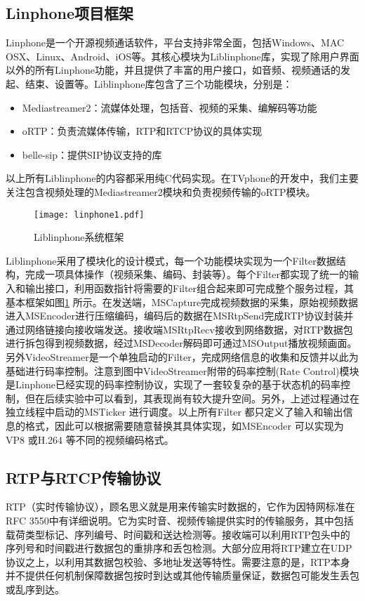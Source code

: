     \subsection{Linphone项目框架}
    Linphone是一个开源视频通话软件，平台支持非常全面，包括Windows、MAC OSX、Linux、Android、iOS等。其核心模块为Liblinphone库，实现了除用户界面以外的所有Linphone功能，并且提供了丰富的用户接口，如音频、视频通话的发起、结束、设置等。Liblinphone库包含了三个功能模块，分别是：
    \begin{itemize}
        \item Mediastreamer2：流媒体处理，包括音、视频的采集、编解码等功能
        \item oRTP：负责流媒体传输，RTP和RTCP协议的具体实现
        \item belle-sip：提供SIP协议支持的库
    \end{itemize}
    以上所有Liblinphone的内容都采用纯C代码实现。在TVphone的开发中，我们主要关注包含视频处理的Mediastreamer2模块和负责视频传输的oRTP模块。

    \begin{figure}[htbp]
      \centering
      \texttt{[image: linphone1.pdf]}
      \caption{Liblinphone系统框架}
      \label{fig:linphone1}
    \end{figure}

    Liblinphone采用了模块化的设计模式，每一个功能模块实现为一个Filter数据结构，完成一项具体操作（视频采集、编码、封装等）。每个Filter都实现了统一的输入和输出接口，利用函数指针将需要的Filter组合起来即可完成整个服务过程，其基本框架如图\ref{fig:linphone1} 所示。在发送端，MSCapture完成视频数据的采集，原始视频数据进入MSEncoder进行压缩编码，编码后的数据在MSRtpSend完成RTP协议封装并通过网络链接向接收端发送。接收端MSRtpRecv接收到网络数据，对RTP数据包进行拆包得到视频数据，经过MSDecoder解码即可通过MSOutput播放视频画面。另外VideoStreamer是一个单独启动的Filter，完成网络信息的收集和反馈并以此为基础进行码率控制。注意到图中VideoStreamer附带的码率控制(Rate Control)模块是Linphone已经实现的码率控制协议，实现了一套较复杂的基于状态机的码率控制，但在后续实验中可以看到，其表现尚有较大提升空间。另外，上述过程通过在独立线程中启动的MSTicker 进行调度。以上所有Filter 都只定义了输入和输出信息的格式，因此可以根据需要随意替换其具体实现，如MSEncoder 可以实现为VP8 或H.264 等不同的视频编码格式。

    \subsection{RTP与RTCP传输协议}
    RTP（实时传输协议），顾名思义就是用来传输实时数据的，它作为因特网标准在RFC 3550\cite{jacobson2003rtp}中有详细说明。它为实时音、视频传输提供实时的传输服务，其中包括载荷类型标记、序列编号、时间戳和送达检测等。接收端可以利用RTP包头中的序列号和时间戳进行数据包的重排序和丢包检测。大部分应用将RTP建立在UDP协议之上，以利用其数据包校验、多地址发送等特性。需要注意的是，RTP本身并不提供任何机制保障数据包按时到达或其他传输质量保证，数据包可能发生丢包或乱序到达。

